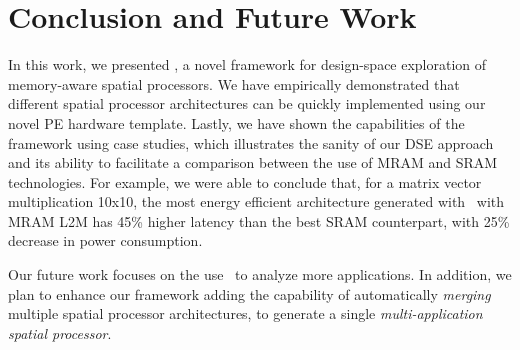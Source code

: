 \section{Conclusion and Future Work}
In this work, we presented \frameworkname, a novel framework for design-space exploration of memory-aware spatial processors.
We have empirically demonstrated that different spatial processor architectures can be quickly implemented using our novel PE hardware template. Lastly, we have shown the capabilities of the framework using case studies, which illustrates the sanity of our DSE approach and its ability to facilitate a comparison between the use of MRAM and SRAM technologies.
For example, we were able to conclude that, for a matrix vector multiplication 10x10, the most energy efficient architecture generated with \frameworkname~with MRAM L2M has 45\% higher latency than the best SRAM counterpart, with 25\% decrease in power consumption.

Our future work focuses on the use \frameworkname~to analyze more applications. In addition, we plan to enhance our framework adding the capability of automatically \textit{merging} multiple spatial processor architectures, to generate a single \textit{multi-application spatial processor}.
